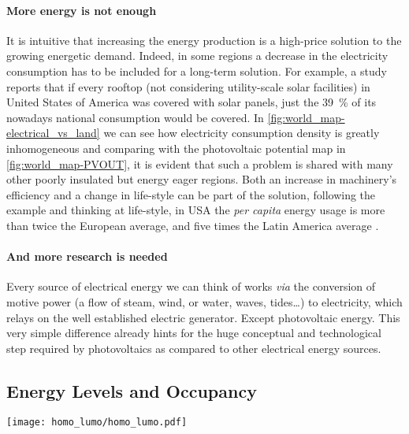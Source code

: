 	\paragraph{More energy is not enough} It is intuitive that increasing the energy production is a high-price solution to the growing energetic demand.
	Indeed, in some regions a decrease in the electricity consumption has to be included for a long-term solution.
	For example, a study \cite{Margolis2016} reports that if every rooftop (not considering utility-scale solar facilities) in United States of America was covered with solar panels, just the 39~\% of its nowadays national consumption would be covered.
	In \cref{fig:world_map-electrical_vs_land} we can see how electricity consumption density is greatly inhomogeneous and comparing with the photovoltaic potential map in \cref{fig:world_map-PVOUT}, it is evident that such a problem is shared with many other poorly insulated but energy eager regions.
	Both an increase in machinery's efficiency and a change in life-style can be part of the solution, following the example and thinking at life-style, in USA the \textsl{per capita} energy usage is more than twice the European average, and five times the Latin America average \cite{IEA}.

	\paragraph{And more research is needed} Every source of electrical energy we can think of works \textsl{via} the conversion of motive power (a flow of steam, wind, or water, waves, tides\dots) to electricity, which relays on the well established electric generator.
	Except photovoltaic energy.
	This very simple difference already hints for the huge conceptual and technological step required by photovoltaics as compared to other electrical energy sources.


	\subsection{Energy Levels and Occupancy}
			
	\begin{SCfigure}
		\centering
		\texttt{[image: homo\_lumo/homo\_lumo.pdf]}
		\label{fig:homo_lumo}
	\end{SCfigure}
		
